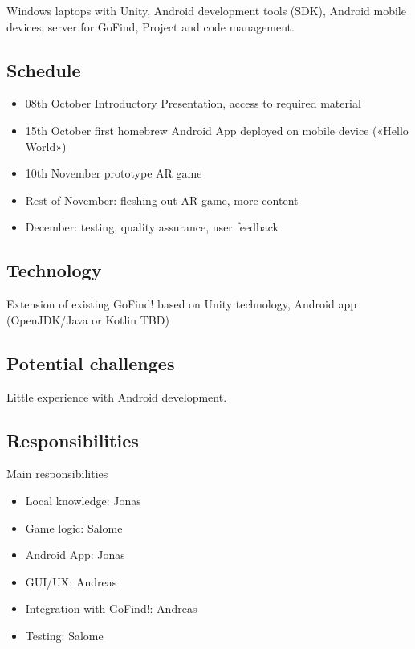\documentclass[10pt]{article}%
\begin{document}
Windows laptops with Unity, Android development tools (SDK), Android mobile devices, server for GoFind,  Project and code management.

\subsection{Schedule}
\begin{itemize}
\item 08th October Introductory Presentation, access to required material
\item 15th October first homebrew Android App deployed on mobile device («Hello World»)
\item 10th November prototype AR game
\item Rest of November: fleshing out AR game, more content
\item December: testing, quality assurance, user feedback
\end{itemize}


\subsection{Technology}

Extension of existing GoFind! based on Unity technology, Android app (OpenJDK/Java or Kotlin TBD)

\subsection{Potential challenges}

Little experience with Android development. 

\subsection{Responsibilities}

Main responsibilities
\begin{itemize}
\item Local knowledge: Jonas
\item Game logic: Salome
\item Android App: Jonas
\item GUI/UX: Andreas
\item Integration with GoFind!: Andreas
\item Testing: Salome
\end{itemize}
\end{document}
